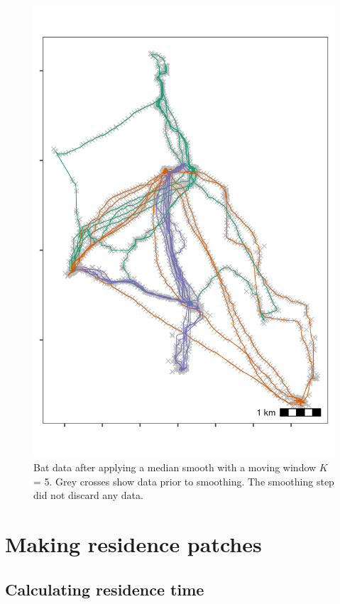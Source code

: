 \documentclass[]{scrreprt}
\begin{document}
\begin{figure}
\centering
\includegraphics{figures/fig_bat_smooth.png}
\caption{Bat data after applying a median smooth with a moving window \(K\) = 5. Grey crosses show data prior to smoothing. The smoothing step did not discard any data.}
\end{figure}

\hypertarget{making-residence-patches}{%
\section{Making residence patches}\label{making-residence-patches}}

\hypertarget{calculating-residence-time}{%
\subsection{Calculating residence time}\label{calculating-residence-time}}
\end{document}
